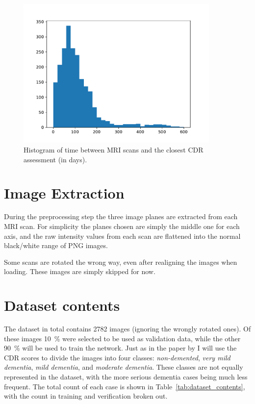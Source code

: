 \documentclass{kththesis}
\begin{document}
\begin{figure}
  \begin{center}
    \includegraphics[width=100mm]{img/mri_cdr_offset.pdf}
    \caption{Histogram of time between MRI scans and the closest CDR assessment (in days).}
    \label{fig:mri_cdr_offset}
  \end{center}
\end{figure}

\section{Image Extraction}
During the preprocessing step the three image planes are extracted from each MRI scan. For simplicity the planes chosen are simply the middle one for each axis, and the raw intensity values from each scan are flattened into the normal black/white range of PNG images.

Some scans are rotated the wrong way, even after realigning the images when loading. These images are simply skipped for now.

\section{Dataset contents}
The dataset in total contains 2782 images (ignoring the wrongly rotated ones). Of these images 10~\% were selected to be used as validation data, while the other 90~\% will be used to train the network. Just as in the paper by \textcite{islam2018early} I will use the CDR scores to divide the images into four classes: \textit{non-demented}, \textit{very mild dementia}, \textit{mild dementia}, and \textit{moderate dementia}. These classes are not equally represented in the dataset, with the more serious dementia cases being much less frequent. The total count of each case is shown in Table~\ref{tab:dataset_contents}, with the count in training and verification broken out.
\end{document}
